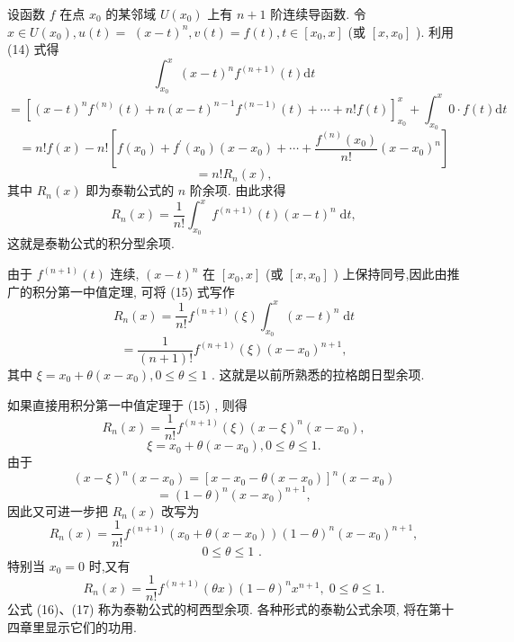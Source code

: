 设函数 \(f\) 在点 \({x}_{0}\) 的某邻域 \(U\left( {x}_{0}\right)\) 上有 \(n + 1\) 阶连续导函数. 令 \(x \in  U\left( {x}_{0}\right) ,u\left( t\right)  =\)  \({\left( x - t\right) }^{n},v\left( t\right)  = f\left( t\right) ,t \in  \left\lbrack  {{x}_{0},x}\right\rbrack\) (或 \(\left\lbrack  {x,{x}_{0}}\right\rbrack\) ). 利用 (14) 式得
\[
{\int }_{{x}_{0}}^{x}{\left( x - t\right) }^{n}{f}^{\left( n + 1\right) }\left( t\right) \mathrm{d}t
\]
\[
= {\left\lbrack  {\left( x - t\right) }^{n}{f}^{\left( n\right) }\left( t\right)  + n{\left( x - t\right) }^{n - 1}{f}^{\left( n - 1\right) }\left( t\right)  + \cdots  + n!f\left( t\right) \right\rbrack  }_{{x}_{0}}^{x} + {\int }_{{x}_{0}}^{x}0 \cdot  f\left( t\right) \mathrm{d}t
\]
\[
= n!f\left( x\right)  - n!\left\lbrack  {f\left( {x}_{0}\right)  + {f}^{\prime }\left( {x}_{0}\right) \left( {x - {x}_{0}}\right)  + \cdots  + \frac{{f}^{\left( n\right) }\left( {x}_{0}\right) }{n!}{\left( x - {x}_{0}\right) }^{n}}\right\rbrack
\]
\[
= n!{R}_{n}\left( x\right) ,
\]
其中 \({R}_{n}\left( x\right)\) 即为泰勒公式的 \(n\) 阶余项. 由此求得
\[
{R}_{n}\left( x\right)  = \frac{1}{n!}{\int }_{{x}_{0}}^{x}{f}^{\left( n + 1\right) }\left( t\right) {\left( x - t\right) }^{n}\mathrm{\;d}t, \tag{15}
\]
这就是泰勒公式的积分型余项.

由于 \({f}^{\left( n + 1\right) }\left( t\right)\) 连续, \({\left( x - t\right) }^{n}\) 在 \(\left\lbrack  {{x}_{0},x}\right\rbrack\) (或 \(\left\lbrack  {x,{x}_{0}}\right\rbrack\) ) 上保持同号,因此由推广的积分第一中值定理, 可将 (15) 式写作
\[
{R}_{n}\left( x\right)  = \frac{1}{n!}{f}^{\left( n + 1\right) }\left( \xi \right) {\int }_{{x}_{0}}^{x}{\left( x - t\right) }^{n}\mathrm{\;d}t
\]
\[
= \frac{1}{\left( {n + 1}\right) !}{f}^{\left( n + 1\right) }\left( \xi \right) {\left( x - {x}_{0}\right) }^{n + 1},
\]
其中 \(\xi  = {x}_{0} + \theta \left( {x - {x}_{0}}\right) ,0 \leq  \theta  \leq  1\) . 这就是以前所熟悉的拉格朗日型余项.

如果直接用积分第一中值定理于 (15) , 则得
\[
{R}_{n}\left( x\right)  = \frac{1}{n!}{f}^{\left( n + 1\right) }\left( \xi \right) {\left( x - \xi \right) }^{n}\left( {x - {x}_{0}}\right) ,
\]
\[
\xi  = {x}_{0} + \theta \left( {x - {x}_{0}}\right) ,0 \leq  \theta  \leq  1.
\]
由于
\[
{\left( x - \xi \right) }^{n}\left( {x - {x}_{0}}\right)  = {\left\lbrack  x - {x}_{0} - \theta \left( x - {x}_{0}\right) \right\rbrack  }^{n}\left( {x - {x}_{0}}\right)
\]
\[
= {\left( 1 - \theta \right) }^{n}{\left( x - {x}_{0}\right) }^{n + 1},
\]
因此又可进一步把 \({R}_{n}\left( x\right)\) 改写为
\[
{R}_{n}\left( x\right)  = \frac{1}{n!}{f}^{\left( n + 1\right) }\left( {{x}_{0} + \theta \left( {x - {x}_{0}}\right) }\right) {\left( 1 - \theta \right) }^{n}{\left( x - {x}_{0}\right) }^{n + 1},
\]
\[
0 \leq  \theta  \leq  1\text{ . } \tag{16}
\]
特别当 \({x}_{0} = 0\) 时,又有
\[
{R}_{n}\left( x\right)  = \frac{1}{n!}{f}^{\left( n + 1\right) }\left( {\theta x}\right) {\left( 1 - \theta \right) }^{n}{x}^{n + 1},\;0 \leq  \theta  \leq  1. \tag{17}
\]
公式 (16)、(17) 称为泰勒公式的柯西型余项. 各种形式的泰勒公式余项, 将在第十四章里显示它们的功用.

